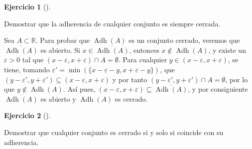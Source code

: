 \documentclass[
  spanish,
  a4paper,
]{scrreport}
\theoremstyle{definition}
\newtheorem{exercise}{Ejercicio}[chapter]
\theoremstyle{remark}
\begin{document}
\begin{exercise}[]\protect\hypertarget{exr-adherencia-cerrada}{}\label{exr-adherencia-cerrada}

Demostrar que la adherencia de cualquier conjunto es siempre cerrada.

\end{exercise}

\begin{tcolorbox}[enhanced jigsaw, arc=.35mm, bottomrule=.15mm, bottomtitle=1mm, breakable, colback=white, colbacktitle=quarto-callout-tip-color!10!white, colframe=quarto-callout-tip-color-frame, coltitle=black, left=2mm, leftrule=.75mm, opacityback=0, opacitybacktitle=0.6, rightrule=.15mm, title=\textcolor{quarto-callout-tip-color}{\faLightbulb}\hspace{0.5em}{Solución}, titlerule=0mm, toprule=.15mm, toptitle=1mm]

Sea \(A\subset \mathbb{R}\). Para probar que \(\operatorname{Adh}(A)\)
es un conjunto cerrado, veremos que \(\overline{\operatorname{Adh}(A)}\)
es abierto. Si \(x\in\overline{\operatorname{Adh}(A)}\), entonces
\(x\not\in\operatorname{Adh}(A)\), y existe un \(\varepsilon>0\) tal que
\((x-\varepsilon,x+\varepsilon)\cap A = \emptyset\). Para cualquier
\(y\in (x-\varepsilon,x+\varepsilon)\), se tiene, tomando
\(\varepsilon'=\min(\{x-\varepsilon-y,x+\varepsilon-y\})\), que
\((y-\varepsilon',y+\varepsilon')\subseteq (x-\varepsilon,x+\varepsilon)\)
y por tanto \((y-\varepsilon',y+\varepsilon')\cap A = \emptyset\), por
lo que \(y\not\in\operatorname{Adh}(A)\). Así pues,
\((x-\varepsilon,x+\varepsilon)\subseteq \overline{\operatorname{Adh}(A)}\),
y por consiguiente \(\overline{\operatorname{Adh}(A)}\) es abierto y
\(\operatorname{Adh}(A)\) es cerrado.

\end{tcolorbox}

\begin{exercise}[]\protect\hypertarget{exr-adherencia-cerrada}{}\label{exr-adherencia-cerrada}

Demostrar que cualquier conjunto es cerrado si y solo si coincide con su
adherencia.

\end{exercise}
\end{document}
